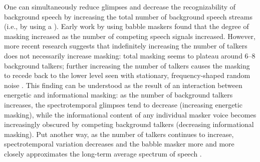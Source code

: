 One can simultaneously reduce glimpses and decrease the recognizability of background speech by increasing the total number of background speech streams (i.e., by using a ).  Early work by \citet{Miller1947} using babble maskers found that the degree of masking increased as the number of competing speech signals increased.  However, more recent research suggests that indefinitely increasing the number of talkers does not necessarily increase masking: total masking seems to plateau around 6–8 background talkers; further increasing the number of talkers causes the masking to recede back to the lower level seen with stationary, frequency-shaped random noise \citep{BrungartEtAl2001,SimpsonCooke2005}.  This finding can be understood as the result of an interaction between energetic and informational masking: %
as the number of background talkers increases, the spectrotemporal glimpses tend to decrease (increasing energetic masking), while the informational content of any individual masker voice becomes increasingly obscured by competing background talkers (decreasing informational masking).  %
Put another way, as the number of talkers continues to increase, spectrotemporal variation decreases and the babble masker more and more closely approximates the long-term average spectrum of speech \citep{SimpsonCooke2005}.

